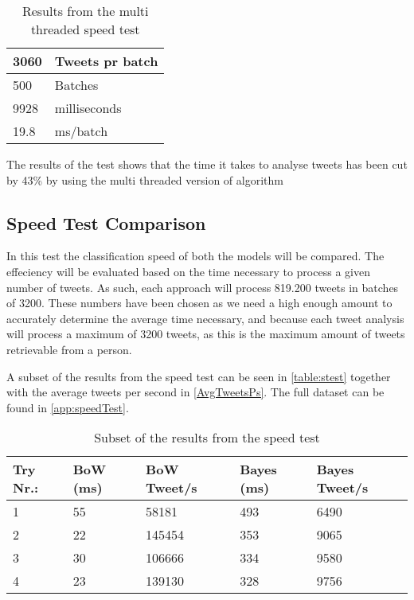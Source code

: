 \begin{table}[H]\centering
\begin{tabular}{|l|l|}
\hline
3060	&	Tweets pr batch 	\\\hline
500		&	Batches				\\\hline
9928 	&	milliseconds		\\\hline
19.8	&	ms/batch 			\\\hline
\end{tabular}
\caption{Results from the multi threaded speed test}
\label{speedTestResMultiThread}
\end{table}

The results of the test shows that the time it takes to analyse tweets has been
cut by 43\% by using the multi threaded version of algorithm 

\subsection{Speed Test Comparison}
In this test the classification speed of both the models will be compared. The
effeciency will be evaluated based on the time necessary to process a given
number of tweets. As such, each approach will process 819.200 tweets in batches
of 3200. These numbers have been chosen as we need a high enough amount to
accurately determine the average time necessary, and because each tweet
analysis will process a maximum of 3200 tweets, as this is the maximum amount
of tweets retrievable from a person.\nl

A subset of the results from the speed test can be seen in \autoref{table:stest}
together with the average tweets per second in \autoref{AvgTweetsPs}. The
full dataset can be found in \autoref{app:speedTest}.

\begin{table}[H]\centering
\begin{tabular}{|l|l|l|l|l|}
\hline
Try Nr.:	&	BoW (ms)	&	BoW Tweet/s	&	Bayes (ms)	&	Bayes Tweet/s	\\\hline
1	&	55	&	58181	&	493	&	6490 \\\hline
2	&	22	&	145454	&	353	&	9065 \\\hline
3	&	30	&	106666	&	334	&	9580 \\\hline
4	&	23	&	139130	&	328	&	9756 \\\hline		
\end{tabular}
\caption{Subset of the results from the speed test}
\label{table:stest}
\end{table}

